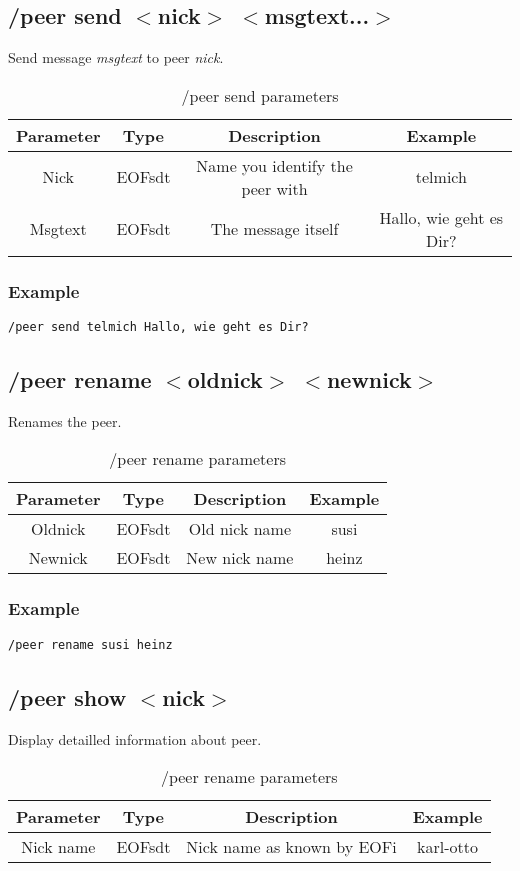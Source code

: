 \documentclass[12pt,a4paper]{book}
\begin{document}
\subsection{/peer send $<$nick$>$ $<$msgtext...$>$}
Send message \textit{msgtext} to peer \textit{nick}.

%
\begin{longtable}{|c|c|c|c|}
\caption{/peer send parameters}\\
\hline
\textbf{Parameter} & \textbf{Type} & \textbf{Description} & \textbf{Example}\\
\hline
Nick & EOFsdt & Name you identify the peer with & telmich\\
\hline
Msgtext & EOFsdt & The message itself & Hallo, wie geht es Dir?\\
\hline
\end{longtable}

\subsubsection{Example}
\begin{verbatim}
/peer send telmich Hallo, wie geht es Dir?
\end{verbatim}
\subsection{/peer rename $<$oldnick$>$ $<$newnick$>$}
Renames the peer.
%
\begin{longtable}{|c|c|c|c|}
\caption{/peer rename parameters}\\
\hline
\textbf{Parameter} & \textbf{Type} & \textbf{Description} & \textbf{Example}\\
\hline
Oldnick & EOFsdt & Old nick name & susi\\
\hline
Newnick & EOFsdt & New nick name & heinz\\
\hline
\end{longtable}

\subsubsection{Example}
\begin{verbatim}
/peer rename susi heinz
\end{verbatim}
\subsection{/peer show $<$nick$>$}
Display detailled information about peer.
%
\begin{longtable}{|c|c|c|c|}
\caption{/peer rename parameters}\\
\hline
\textbf{Parameter} & \textbf{Type} & \textbf{Description} & \textbf{Example}\\
\hline
Nick name & EOFsdt & Nick name as known by EOFi & karl-otto\\
\hline
\end{longtable}
\end{document}

